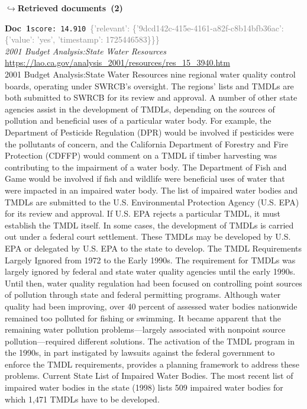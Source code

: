 \documentclass[a4paper,11pt]{article}
\begin{document}
\noindent\hfill{\footnotesize\textcolor{doccolor}{\textbf{$\hookrightarrow$\enspace Retrieved documents~(2)}}}
\begin{docenv}
{\footnotesize\textcolor{doccolor}{\textbf{Doc~1}}}\hfill{\tiny\texttt{score:~14.910}}\ {\tiny\textcolor{gray}{\{'relevant': \{'9dcd142c-415e-4161-a82f-c8b14bfb36ac': \{'value': 'yes', 'timestamp': 1725446583\}\}\}}}\\[3pt]
{\small\textit{2001 Budget Analysis:State Water Resources }}\\[2pt]
{\tiny\url{https://lao.ca.gov/analysis\_2001/resources/res\_15\_3940.htm}}\\[4pt]
{\footnotesize 2001 Budget Analysis:State Water Resources 
nine regional water quality control boards, operating under SWRCB's oversight. The regions' lists and TMDLs are both submitted to SWRCB for its review and
approval.
A number of other state agencies assist in the development of TMDLs, depending on the sources of pollution and beneficial uses of a particular water body. For
example, the Department of Pesticide Regulation (DPR) would be involved if pesticides were the pollutants of concern, and the California Department of
Forestry and Fire Protection (CDFFP) would comment on a TMDL if timber harvesting was contributing to the impairment of a water body. The Department of
Fish and Game would be involved if fish and wildlife were beneficial uses of water that were impacted in an impaired water body.
The list of impaired water bodies and TMDLs are submitted to the U.S. Environmental Protection Agency (U.S. EPA) for its review and approval. If U.S. EPA
rejects a particular TMDL, it must establish the TMDL itself. In some cases, the development of TMDLs is carried out under a federal court settlement. These
TMDLs may be developed by U.S. EPA or delegated by U.S. EPA to the state to develop.
The TMDL Requirements Largely Ignored from 1972 to the Early 1990s. The requirement for TMDLs was largely ignored by federal and state water quality
agencies until the early 1990s. Until then, water quality regulation had been focused on controlling point sources of pollution through state and federal
permitting programs. Although water quality had been improving, over 40 percent of assessed water bodies nationwide remained too polluted for fishing or
swimming. It became apparent that the remaining water pollution problems—largely associated with nonpoint source pollution—required different solutions. The
activation of the TMDL program in the 1990s, in part instigated by lawsuits against the federal government to enforce the TMDL requirements, provides a
planning framework to address these problems.
Current State List of Impaired Water Bodies. The most recent list of impaired water bodies in the state (1998) lists 509 impaired water bodies for which 1,471
TMDLs have to be developed.}
\end{docenv}
\end{document}
